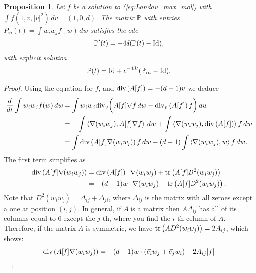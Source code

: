 \documentclass[11pt]{amsart}
\numberwithin{equation}{section}
\newtheorem{proposition}{Proposition}
\begin{document}
\begin{proposition}\label{thm:ODE_coeff}
 Let $f$ be a solution to (\ref{eq:Landau_max_mol}) with  $\int f(1,v,|v|^2)\,dv =(1,0,d)$. The matrix $\mathbb{P}$ with entries $P_{ij}(t)=\int w_i w_j f(w)\,dw$ satisfies the ode
  \begin{align} \label{ode_lambda_i}
  \mathbb{P}'(t) = -4d (\mathbb{P}(t)-\textnormal{Id}),
  \end{align}
 with explicit solution
 $$\mathbb{P}(t)= \textnormal{Id} + e^{-4dt}(\mathbb{P}_{in}-\textnormal{Id}).$$
\end{proposition}
% 
\begin{proof}
  Using the equation for $f$, and $\textnormal{div}\left(A[f]\right)=-(d-1)v$ we deduce
  \begin{align*}
    \frac{d}{dt}\int w_{i}w_{j}f(w)\,dw & =\int w_{i}w_{j}\textnormal{div}_{v}\bigg(A[f]\nabla f\,dw-\textnormal{div}_{v}\left(A[f]\right)f\bigg)\,dw\\
     & =-\int\left\langle \nabla(w_{i}w_{j}),A[f]\nabla f \right\rangle\,dw +\int\left\langle \nabla(w_{i}w_{j}),\textnormal{div}\left(A[f]\right) \right\rangle f\,dw\\
     & =\int\textnormal{div}\left(A[f]\nabla(w_{i}w_{j})\right)f\,dw-(d-1)\int\left\langle \nabla(w_{i}w_{j}),w \right\rangle f\,dw.
  \end{align*}
  The first term simplifies as
  \begin{align*}
    \textnormal{div}\left(A[f]\nabla(w_{i}w_{j})\right) & =\textnormal{div}\left(A[f]\right)\cdot\nabla(w_{i}w_{j})+\textnormal{tr}\left(A[f] D^{2}(w_{i}w_{j})\right)\\
      & =-(d-1)w\cdot\nabla(w_{i}w_{j})+\textnormal{tr}\left(A[f] D^{2}(w_{i}w_{j})\right).
  \end{align*}
  Note that $D^{2}(w_{i}w_{j})=\Delta_{ij}+\Delta_{ji}$, where $\Delta_{ij}$ is the matrix with all zeroes except a one at position $(i,j)$. In general, if $A$ is a matrix then $A\Delta_{ij}$ has all of its columns equal to $0$ except the $j$-th, where you find the $i$-th column of $A$. Therefore, if the matrix $A$ is symmetric, we have $\textnormal{tr}\left(AD^{2}(w_{i}w_{j})\right)=2A_{ij}$, which shows:
  \begin{equation*}
    \textnormal{div}\left(A[f]\nabla(w_{i}w_{j})\right)=
    -(d-1)w\cdot\left(\vec{e}_{i}w_{j}+\vec{e}_{j}w_{i}\right)+2A_{ij}[f]

\end{equation*}
\end{proof}
\end{document}

